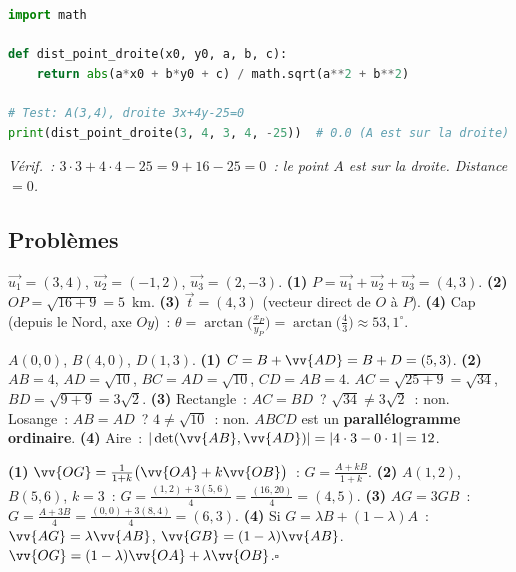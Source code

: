 
\begin{lstlisting}[language=Python]
import math

def dist_point_droite(x0, y0, a, b, c):
    return abs(a*x0 + b*y0 + c) / math.sqrt(a**2 + b**2)

# Test: A(3,4), droite 3x+4y-25=0
print(dist_point_droite(3, 4, 3, 4, -25))  # 0.0 (A est sur la droite)
\end{lstlisting}
\emph{V\'erif.~: $3\cdot3+4\cdot4-25=9+16-25=0$~: le point $A$ est sur la droite.
Distance $= 0$.\checkmark}

\subsection*{Probl\`emes}


$\vec{u_1}=(3,4)$, $\vec{u_2}=(-1,2)$, $\vec{u_3}=(2,-3)$.
\textbf{(1)} $P=\vec{u_1}+\vec{u_2}+\vec{u_3}=(4,3)$.
\textbf{(2)} $OP=\sqrt{16+9}=5$~km.
\textbf{(3)} $\vec{t}=(4,3)$ (vecteur direct de $O$ \`a $P$).
\textbf{(4)} Cap (depuis le Nord, axe $Oy$)~:
$\theta=\arctan\bigl(\frac{x_P}{y_P}\bigr)=\arctan\bigl(\frac{4}{3}\bigr)\approx53{,}1^{\circ}$.


$A(0,0)$, $B(4,0)$, $D(1,3)$.
\textbf{(1)} $C=B+\vv{AD}=B+D=(5,3)$.
\textbf{(2)} $AB=4$, $AD=\sqrt{10}$, $BC=AD=\sqrt{10}$, $CD=AB=4$.
$AC=\sqrt{25+9}=\sqrt{34}$, $BD=\sqrt{9+9}=3\sqrt{2}$.
\textbf{(3)} Rectangle~: $AC=BD$~? $\sqrt{34}\ne3\sqrt{2}$~: non.
Losange~: $AB=AD$~? $4\ne\sqrt{10}$~: non.
$ABCD$ est un \textbf{parall\'elogramme ordinaire}.
\textbf{(4)} Aire~: $|\det(\vv{AB},\vv{AD})|=|4\cdot3-0\cdot1|=12$.


\textbf{(1)} $\vv{OG}=\frac{1}{1+k}\bigl(\vv{OA}+k\vv{OB}\bigr)$~:
$G=\frac{A+kB}{1+k}$.
\textbf{(2)} $A(1,2)$, $B(5,6)$, $k=3$~: $G=\frac{(1,2)+3(5,6)}{4}=\frac{(16,20)}{4}=(4,5)$.
\textbf{(3)} $AG=3GB$~: $G=\frac{A+3B}{4}=\frac{(0,0)+3(8,4)}{4}=(6,3)$.
\textbf{(4)} Si $G=\lambda B+(1-\lambda)A$~:
$\vv{AG}=\lambda\vv{AB}$, $\vv{GB}=(1-\lambda)\vv{AB}$.
$\vv{OG}=(1-\lambda)\vv{OA}+\lambda\vv{OB}$.\hfill$\square$

